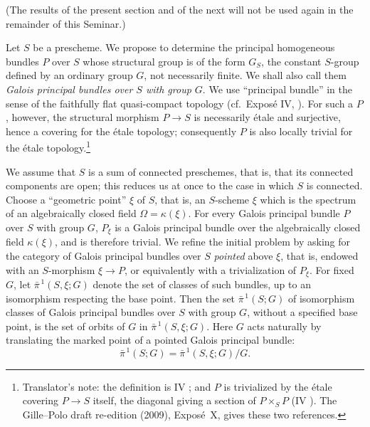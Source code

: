 (The results of the present section and of the next will not be used again
in the remainder of this Seminar.)

Let \(S\) be a prescheme. We propose to determine the principal homogeneous
bundles \(P\) over \(S\) whose structural group is of the form \(G_S\), the
constant \(S\)-group defined by an ordinary group \(G\), not necessarily
finite. We shall also call them \emph{Galois principal bundles over \(S\)
with group \(G\)}. We use ``principal bundle'' in the sense of the
faithfully flat quasi-compact topology (cf.\ Exposé IV, ). For
such a \(P\), however, the structural morphism \(P\to S\) is necessarily
étale and surjective, hence a covering for the étale topology; consequently
\(P\) is also locally trivial for the étale topology.\footnote{Translator's
note: the definition is IV ; and \(P\) is trivialized by the étale
covering \(P\to S\) itself, the diagonal giving a section of \(P\times_SP\)
(IV ). The Gille--Polo draft re-edition (2009), Expos\'e~X,
gives these two references.}

We assume that \(S\) is a sum of connected preschemes, that is, that its
connected components are open; this reduces us at once to the case in which
\(S\) is connected. Choose a ``geometric point'' \(\xi\) of \(S\), that
is, an \(S\)-scheme \(\xi\) which is the spectrum of an algebraically
closed field \(\Omega=\kappa(\xi)\). For every Galois principal bundle
\(P\) over \(S\) with group \(G\), \(P_\xi\) is a Galois principal bundle
over the algebraically closed field \(\kappa(\xi)\), and is therefore
trivial. We refine the initial problem by asking for the category of Galois
principal bundles over \(S\) \emph{pointed} above \(\xi\), that is, endowed
with an \(S\)-morphism \(\xi\to P\), or equivalently with a trivialization
of \(P_\xi\). For fixed \(G\), let
\(\bar\pi^{\,1}(S,\xi;G)\) denote the set of classes of such bundles, up to
an isomorphism respecting the base point. Then the set
\(\bar\pi^{\,1}(S;G)\) of isomorphism classes of Galois principal bundles
over \(S\) with group \(G\), without a specified base point, is the set of
orbits of \(G\) in \(\bar\pi^{\,1}(S,\xi;G)\). Here \(G\) acts naturally
by translating the marked point of a pointed Galois principal bundle:
\[
  \bar\pi^{\,1}(S;G)=\bar\pi^{\,1}(S,\xi;G)/G.
\]

